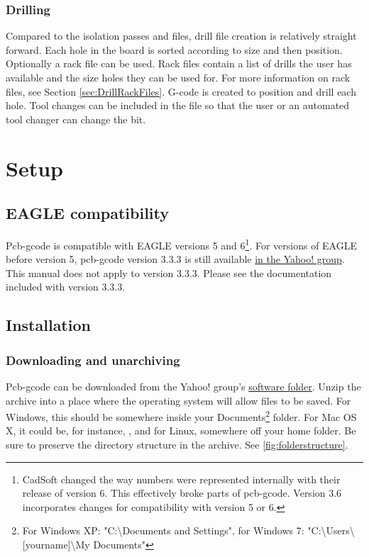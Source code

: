 \documentclass[11pt]{book}
\begin{document}
\subsection{Drilling}
Compared to the isolation passes and files, drill file creation is relatively straight forward. Each hole in the board is sorted according to size and then position. Optionally a rack file can be used. Rack files contain a list of drills the user has available and the size holes they can be used for. For more information on rack files, see Section \vref{sec:DrillRackFiles}. G-code is created to position and drill each hole. Tool changes can be included in the file so that the user or an automated tool changer can change the bit.

%
\chapter{Setup}\label{chp:Setup}
%

%
%
\section{EAGLE compatibility}\label{sec:EAGLECompatibility}

Pcb-gcode is compatible with EAGLE versions 5 and 6\footnote{CadSoft changed the way numbers were represented internally with their release of version 6. This effectively broke parts of pcb-gcode. Version 3.6 incorporates changes for compatibility with version 5 or 6.}. For versions of EAGLE before version 5, pcb-gcode version 3.3.3 is still available \href{http://groups.yahoo.com/group/pcb-gcode/files/\%21\%20Software/pcb-gcode-3.3.3.zip}{in the Yahoo! group}. This manual does not apply to version 3.3.3. Please see the documentation included with version 3.3.3.
%
%
\section{Installation}\label{sec:Installation}

\subsection{Downloading and unarchiving}
Pcb-gcode can be downloaded from the Yahoo! group's \href{http://groups.yahoo.com/group/pcb-gcode/files/\%21\%20Software}{software folder}.  Unzip the archive into a place where the operating system will allow files to be saved. For Windows, this should be somewhere inside your Documents\footnote{For Windows XP: "C:\textbackslash{}Documents and Settings", for Windows 7: "C:\textbackslash{}Users\textbackslash{}[yourname]\textbackslash{}My Documents" } folder. For Mac OS X, it could be, for instance, , and for Linux, somewhere off your home folder. Be sure to preserve the directory structure in the archive. See \figurename \vref{fig:folderstructure}.
\end{document}
